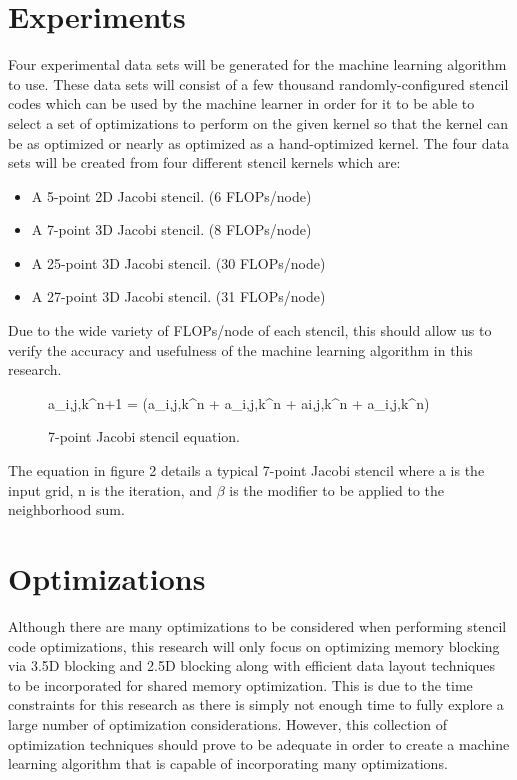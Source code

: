 \documentclass[conference]{IEEEtran}
\begin{document}
\section{Experiments}
Four experimental data sets will be generated for the machine learning algorithm to use. These data sets will consist of a few thousand randomly-configured stencil codes which can be used by the machine learner in order for it to be able to select a set of optimizations to perform on the given kernel so that the kernel can be as optimized or nearly as optimized as a hand-optimized kernel. The four data sets will be created from four different stencil kernels which are:
\begin{itemize}
\item A 5-point 2D Jacobi stencil. (6 FLOPs/node)
\item A 7-point 3D Jacobi stencil. (8 FLOPs/node)
\item A 25-point 3D Jacobi stencil. (30 FLOPs/node)
\item A 27-point 3D Jacobi stencil. (31 FLOPs/node)
\end{itemize}

Due to the wide variety of FLOPs/node of each stencil, this should allow us to verify the accuracy and usefulness of the machine learning algorithm in this research.

\begin{figure}[h!]
    \centering
    a_{i,j,k}^{n+1} = \beta(a_{i,j,k}^n + a_{i,j,k}^n + a{i,j,k}^n + a_{i,j,k}^n)
    \caption{7-point Jacobi stencil equation.}
\end{figure}

The equation in figure 2 details a typical 7-point Jacobi stencil where a is the input grid, n is the iteration, and \(\beta\) is the modifier to be applied to the neighborhood sum.

\section{Optimizations}
Although there are many optimizations to be considered when performing stencil code optimizations, this research will only focus on optimizing memory blocking via 3.5D blocking\cite{Nguy} and 2.5D blocking\cite{Datta} along with efficient data layout techniques to be incorporated for shared memory optimization\cite{Jaeger}. This is due to the time constraints for this research as there is simply not enough time to fully explore a large number of optimization considerations. However, this collection of optimization techniques should prove to be adequate in order to create a machine learning algorithm that is capable of incorporating many optimizations.
\end{document}
